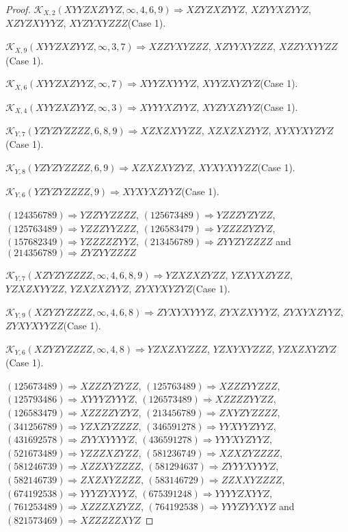 \documentclass[12pt]{article}
\theoremstyle{plain}
\theoremstyle{definition}
\theoremstyle{remark}
\newcommand{\fancy}[1]{\mathcal{#1}}
\def\K{\fancy{K}}
\begin{document}
\begin{proof}
	$\K_{X,2}(XYYZXZYYZ,\infty,4, 6, 9)\Rightarrow $$XZYZXZYYZ$, $XZYYXZYYZ$, $XZYZXYYYZ$, $XYZYXYZZZ$(Case 1).
	
	$\K_{X,9}(XYYZXZYYZ,\infty,3, 7)\Rightarrow $$XZZYXYZZZ$, $XZYYXYZZZ$, $XZZYXYYZZ$(Case 1).
	
	$\K_{X,6}(XYYZXZYYZ,\infty,7)\Rightarrow $$XYYZXYYYZ$, $XYYZXYZYZ$(Case 1).
	
	$\K_{X,4}(XYYZXZYYZ,\infty,3)\Rightarrow $$XYYYXZYYZ$, $XYZYXZYYZ$(Case 1).
	
	$\K_{Y,7}(YZYZYZZZZ,6, 8, 9)\Rightarrow $$XZXZXYYZZ$, $XZXZXZYYZ$, $XYXYXYZYZ$(Case 1).
	
	$\K_{Y,8}(YZYZYZZZZ,6, 9)\Rightarrow $$XZXZXYZYZ$, $XYXYXYYZZ$(Case 1).
	
	$\K_{Y,6}(YZYZYZZZZ,9)\Rightarrow $$XYXYXZYYZ$(Case 1).
	
	
	
	$(1 2 4 3 5 6 7 8 9)\Rightarrow YZZYYZZZZ$, $(1 2 5 6 7 3 4 8 9)\Rightarrow YZZZYZYZZ$, $(1 2 5 7 6 3 4 8 9)\Rightarrow YZZZYYZZZ$, $(1 2 6 5 8 3 4 7 9)\Rightarrow YZZZZYZYZ$, $(1 5 7 6 8 2 3 4 9)\Rightarrow YZZZZZYYZ$, $(2 1 3 4 5 6 7 8 9)\Rightarrow ZYYZYZZZZ$ and $(2 1 4 3 5 6 7 8 9)\Rightarrow ZYZYYZZZZ$
	
	
	$\K_{Y,7}(XZYZYZZZZ,\infty,4, 6, 8, 9)\Rightarrow $$YZXZXZYZZ$, $YZXYXZYZZ$, $YZXZXYYZZ$, $YZXZXZYYZ$, $ZYXYXYZYZ$(Case 1).
	
	$\K_{Y,9}(XZYZYZZZZ,\infty,4, 6, 8)\Rightarrow $$ZYXYXYYYZ$, $ZYXZXYYYZ$, $ZYXYXZYYZ$, $ZYXYXYYZZ$(Case 1).
	
	$\K_{Y,6}(XZYZYZZZZ,\infty,4, 8)\Rightarrow $$YZXZXYZZZ$, $YZXYXYZZZ$, $YZXZXYZYZ$(Case 1).
	
	
	
	$(1 2 5 6 7 3 4 8 9)\Rightarrow XZZZYZYZZ$, $(1 2 5 7 6 3 4 8 9)\Rightarrow XZZZYYZZZ$, $(1 2 5 7 9 3 4 8 6)\Rightarrow XYYYZYYYZ$, $(1 2 6 5 7 3 4 8 9)\Rightarrow XZZZZYYZZ$, $(1 2 6 5 8 3 4 7 9)\Rightarrow XZZZZYZYZ$, $(2 1 3 4 5 6 7 8 9)\Rightarrow ZXYZYZZZZ$, $(3 4 1 2 5 6 7 8 9)\Rightarrow YZXZYZZZZ$, $(3 4 6 5 9 1 2 7 8)\Rightarrow YYXYYZYYZ$, $(4 3 1 6 9 2 5 7 8)\Rightarrow ZYYXYYYYZ$, $(4 3 6 5 9 1 2 7 8)\Rightarrow YYYXYZYYZ$, $(5 2 1 6 7 3 4 8 9)\Rightarrow YZZZXZYZZ$, $(5 8 1 2 3 6 7 4 9)\Rightarrow XZXZYZZZZ$, $(5 8 1 2 4 6 7 3 9)\Rightarrow XZZXYZZZZ$, $(5 8 1 2 9 4 6 3 7)\Rightarrow ZYYYXYYYZ$, $(5 8 2 1 4 6 7 3 9)\Rightarrow ZXZXYZZZZ$, $(5 8 3 1 4 6 7 2 9)\Rightarrow ZZXXYZZZZ$, $(6 7 4 1 9 2 5 3 8)\Rightarrow YYYZYXYYZ$, $(6 7 5 3 9 1 2 4 8)\Rightarrow YYYYZXYYZ$, $(7 6 1 2 5 3 4 8 9)\Rightarrow XZZZXZYZZ$, $(7 6 4 1 9 2 5 3 8)\Rightarrow YYYZYYXYZ$ and $(8 2 1 5 7 3 4 6 9)\Rightarrow XZZZZZXYZ$
	

\end{proof}
\end{document}
